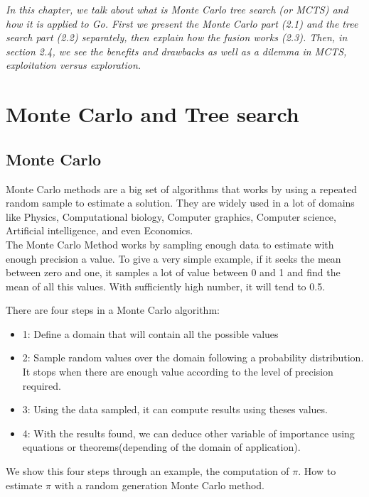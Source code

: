 
\textit{In this chapter, we talk about what is Monte Carlo tree search (or MCTS) and how it is applied to Go.
First we present the Monte Carlo part (2.1) and the tree search part (2.2) separately, then explain how the fusion works (2.3).
Then, in section 2.4, we see the benefits and drawbacks as well as a dilemma in MCTS, exploitation versus exploration. }

\section{Monte Carlo and Tree search}

\subsection{Monte Carlo}

Monte Carlo methods are a big set of algorithms that works by using a repeated random sample to estimate a solution. They are widely used in a lot of domains like Physics, Computational biology, Computer graphics, Computer science, Artificial intelligence, and even Economics. 
\\

The Monte Carlo Method works by sampling enough data to estimate with enough precision a value. To give a very simple example, if it seeks the mean between zero and one, it samples a lot of value between 0 and 1 and find the mean of all this values. With sufficiently high number, it will tend to 0.5.

There are four steps in a Monte Carlo algorithm: 

\begin{itemize}
\item 1: Define a domain that will contain all the possible values 
\item 2: Sample random values over the domain following a probability distribution. It stops when there are enough value according to the level of precision required. 
\item 3: Using the data sampled, it can compute results using theses values. 
\item 4: With the results found, we can deduce other variable of importance using equations or theorems(depending of the domain of application). 
\end{itemize} 

We show this four steps through an example, the computation of $\pi$. How to estimate $\pi$ with a random generation Monte Carlo method. 

